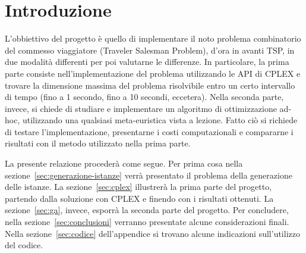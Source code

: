 
\section{Introduzione}\label{sec:introduzione}

L'obbiettivo del progetto è quello di implementare il noto problema combinatorio del commesso viaggiatore (Traveler Salesman Problem), d'ora in avanti TSP, in due modalità differenti
per poi valutarne le differenze.
In particolare, la prima parte consiste nell'implementazione del problema utilizzando le API di CPLEX e trovare la dimensione massima del problema risolvibile entro un certo intervallo
di tempo (fino a 1 secondo, fino a 10 secondi, eccetera).
Nella seconda parte, invece, si chiede di studiare e implementare un algoritmo di ottimizzazione ad-hoc, utilizzando una qualsiasi meta-euristica vista a lezione.
Fatto ciò si richiede di testare l'implementazione, presentarne i costi computazionali e compararne i risultati con il metodo utilizzato nella prima parte.

La presente relazione procederà come segue.
Per prima cosa nella sezione~\ref{sec:generazione-istanze} verrà presentato il problema della generazione delle istanze.
La sezione~\ref{sec:cplex} illustrerà la prima parte del progetto, partendo dalla soluzione con CPLEX e finendo con i risultati ottenuti.
La sezione~\ref{sec:ga}, invece, esporrà la seconda parte del progetto.
Per concludere, nella sezione~\ref{sec:conclusioni} verranno presentate alcune considerazioni finali.
Nella sezione~\ref{sec:codice} dell'appendice si trovano alcune indicazioni sull'utilizzo del codice.
